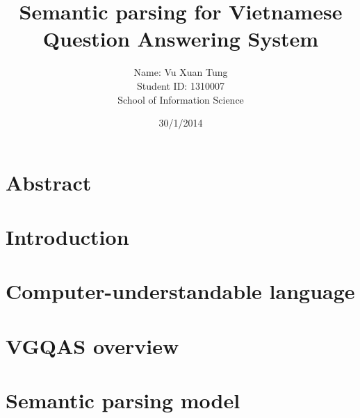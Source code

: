 \documentclass[oneside, 12pt]{book}
\title{Semantic parsing for Vietnamese Question Answering System}
\author{Name: Vu Xuan Tung\\
Student ID: 1310007 \\
School of Information Science}
\date{30/1/2014}
\begin{document}
\fontsize{13pt}{18pt}\selectfont
\maketitle
\frontmatter
\usepackage{array}



\chapter*{\centering Abstract}


\tableofcontents

%

\mainmatter

\chapter{ Introduction}


\chapter{Computer-understandable language}


\chapter{VGQAS overview}


\chapter{Semantic parsing model}






\end{document}
